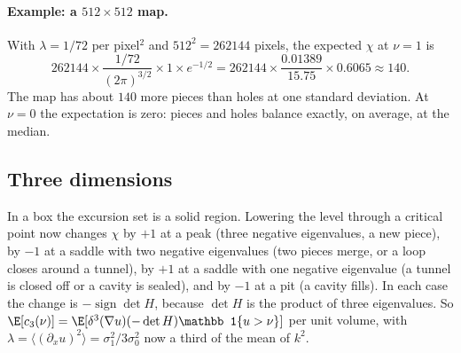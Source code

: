 \paragraph{Example: a $512\times512$ map.} With $\lambda=1/72$ per pixel$^2$ and $512^2=262144$ pixels, the
expected $\chi$ at $\nu=1$ is
\begin{equation*}
  262144\times\frac{1/72}{(2\pi)^{3/2}}\times1\times e^{-1/2}
  =262144\times\frac{0.01389}{15.75}\times0.6065\approx140 .
\end{equation*}
The map has about $140$ more pieces than holes at one standard deviation. At $\nu=0$ the expectation is
zero: pieces and holes balance exactly, on average, at the median.

\subsection{Three dimensions}
\label{12a:sec:gkf3}

In a box the excursion set is a solid region. Lowering the level through a critical point now changes $\chi$
by $+1$ at a peak (three negative eigenvalues, a new piece), by $-1$ at a saddle with two negative
eigenvalues (two pieces merge, or a loop closes around a tunnel), by $+1$ at a saddle with one negative eigenvalue (a tunnel
is closed off or a cavity is sealed), and by $-1$ at a pit (a cavity fills). In each case the change is
$-\operatorname{sign}\det H$, because $\det H$ is the product of three eigenvalues. So
$\E[c_3(\nu)]=\E[\delta^3(\nabla u)(-\det H)\mathbb 1\{u>\nu\}]$ per unit volume, with
$\lambda=\langle(\partial_xu)^2\rangle=\sigma_1^2/3\sigma_0^2$ now a third of the mean of $k^2$.

